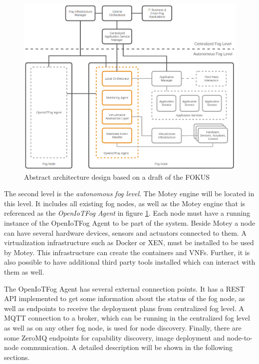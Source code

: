 \begin{figure}[H]
    \centering
    \includegraphics[width=\textwidth]{resources/images/initial_structure.png}
    \caption[Abstract architecture design based on a draft of the FOKUS]{Abstract architecture design based on a draft of the \ac{FOKUS}}
    \label{fig:abstract_architecture_design}
\end{figure}

The second level is the \textit{autonomous fog level}.
The Motey engine will be located in this level.
It includes all existing fog nodes, as well as the Motey engine that is referenced as the \textit{OpenIoTFog Agent} in figure \ref{fig:abstract_architecture_design}.
Each node must have a running instance of the OpenIoTFog Agent to be part of the system.
Beside Motey a node can have several hardware devices, sensors and actuators connected to them.
A virtualization infrastructure such as Docker or XEN, must be installed to be used by Motey.
This infrastructure can create the containers and \acp{VNF}.
Further, it is also possible to have additional third party tools installed which can interact with them as well.

The OpenIoTFog Agent has several external connection points.
It has a \ac{REST} \ac{API} implemented to get some information about the status of the fog node, as well as endpoints to receive the deployment plans from centralized fog level.
A \ac{MQTT} connection to a broker, which can be running in the centralized fog level as well as on any other fog node, is used for node discovery.
Finally, there are some ZeroMQ endpoints for capability discovery, image deployment and node-to-node communication.
A detailed description will be shown in the following sections.


